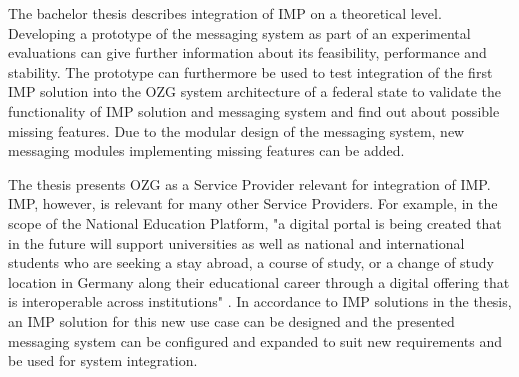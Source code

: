 The bachelor thesis describes integration of IMP on a theoretical level. Developing a prototype of the messaging system as part of an experimental evaluations can give further information about its feasibility, performance and stability. The prototype can furthermore be used to test integration of the first IMP solution into the OZG system architecture of a federal state to validate the functionality of IMP solution and messaging system and find out about possible missing features. Due to the modular design of the messaging system, new messaging modules implementing missing features can be added.

The thesis presents OZG as a Service Provider relevant for integration of IMP. IMP, however, is relevant for many other Service Providers. For example, in the scope of the National Education Platform, "a digital portal is being created that in the future will support universities as well as national and international students who are seeking a stay abroad, a course of study, or a change of study location in Germany along their educational career through a digital offering that is interoperable across institutions" \cite{digitale_bildung}. In accordance to IMP solutions in the thesis, an IMP solution for this new use case can be designed and the presented messaging system can be configured and expanded to suit new requirements and be used for system integration. 

